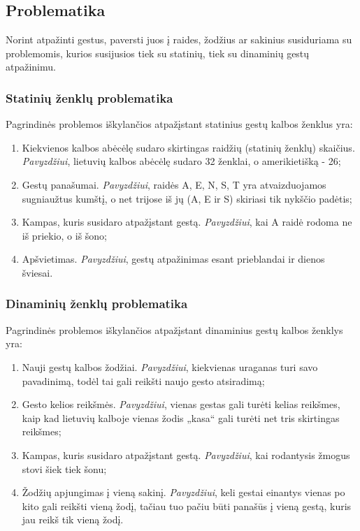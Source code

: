 \documentclass{VUMIFInfKursinis}
\begin{document}
\subsection{Problematika}
Norint atpažinti gestus, paversti juos į raides, žodžius ar sakinius susiduriama su problemomis, kurios susijusios tiek su statinių, tiek su dinaminių gestų atpažinimu.

\subsubsection{Statinių ženklų problematika}
Pagrindinės problemos iškylančios atpažįstant statinius gestų kalbos ženklus yra:
\begin{enumerate}
	\item Kiekvienos kalbos abėcėlę sudaro skirtingas raidžių (statinių ženklų) skaičius. \textit{Pavyzdžiui}, lietuvių kalbos abėcėlę sudaro 32 ženklai, o amerikietišką - 26; 
	\item Gestų panašumai. \textit{Pavyzdžiui}, raidės A, E, N, S, T yra atvaizduojamos sugniaužtus kumštį, o net trijose iš jų (A, E ir S) skiriasi tik nykščio padėtis;
	\item Kampas, kuris susidaro atpažįstant gestą. \textit{Pavyzdžiui}, kai A raidė rodoma ne iš priekio, o iš šono;
	\item Apšvietimas. \textit{Pavyzdžiui}, gestų atpažinimas esant prieblandai ir dienos šviesai.
\end{enumerate}
\subsubsection{Dinaminių ženklų problematika}
Pagrindinės problemos iškylančios atpažįstant dinaminius gestų kalbos ženklys yra:
\begin{enumerate}
	\item Nauji gestų kalbos žodžiai. \textit{Pavyzdžiui}, kiekvienas uraganas turi savo pavadinimą, todėl tai gali reikšti naujo gesto atsiradimą; 
	\item Gesto kelios reikšmės. \textit{Pavyzdžiui}, vienas gestas gali turėti kelias reikšmes, kaip kad lietuvių kalboje vienas žodis „kasa“ gali turėti net tris skirtingas reikšmes;
	\item Kampas, kuris susidaro atpažįstant gestą. \textit{Pavyzdžiui}, kai rodantysis žmogus stovi šiek tiek šonu;
	\item Žodžių apjungimas į vieną sakinį. \textit{Pavyzdžiui}, keli gestai einantys vienas po kito gali reikšti vieną žodį, tačiau tuo pačiu būti panašūs į vieną gestą, kuris jau reikš tik vieną žodį.
\end{enumerate}
\end{document}
